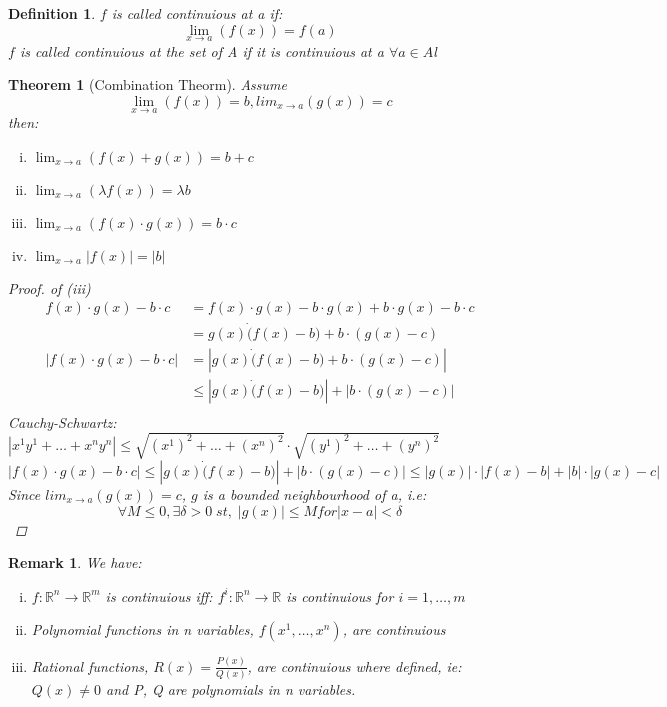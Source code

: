 \documentclass[12pt]{article}
\def\RR{\mathbb{R}}
\newtheorem{theorem}{Theorem}[section]
\newtheorem{definition}{Definition}[section]
\newtheorem*{remark}{Remark}
\begin{document}
\begin{definition}
$f$ is called continuious at a if:
\[\lim_{x\to a} (f(x))=f(a)\]
$f$ is called continuious at the set of A if it is continuious at a $\forall a \in A$l
\end{definition}

\begin{theorem}[Combination Theorm]\label{T:Combination Theorm}
Assume \[\lim_{x\to a} (f(x))=b, lim_{x\to a} (g(x))=c\]
then:
\begin{enumerate}[(i)]
\item$\lim_{x\to a} (f(x) + g(x))=b+c$
\item$\lim_{x\to a} (\lambda f(x))=\lambda b$
\item$\lim_{x\to a} (f(x)\cdot g(x))=b\cdot c$
\item$\lim_{x\to a} |f(x)|=|b|$
\end{enumerate}
\begin{proof}
of (iii)
\begin{align*}
f(x)\cdot g(x)-b\cdot c &= f(x)\cdot g(x) -b\cdot g(x) + b\cdot g(x) -b\cdot c \\
&= g(x)\dot (f(x)-b) + b\cdot (g(x) - c) \\
|f(x)\cdot g(x)-b\cdot c|&= |g(x)\dot (f(x)-b) + b\cdot (g(x) - c)|\\
 &\leq |g(x)\dot (f(x)-b)| +| b\cdot (g(x) - c)|\\
\end{align*}
Cauchy-Schwartz: $|x^{1}y^{1} + \dots +x^{n}y^{n}| \leq \sqrt{(x^{1})^{2} + \dots +(x^{n})^{2}} \cdot \sqrt{(y^{1})^{2} + \dots +(y^{n})^{2}}$
\[|f(x)\cdot g(x)-b\cdot c| \leq |g(x)\dot (f(x)-b)| +| b\cdot (g(x) - c)|  \leq |g(x)|\cdot |f(x)-b| +|b|\cdot |g(x) - c|\]
Since $ lim_{x\to a} (g(x))=c$, $g$ is a bounded neighbourhood of a, i.e: 
\[
\forall M \leq 0, \exists \delta > 0 \; st,\; 
|g(x)| \leq M for |x-a|<\delta\] 
\end{proof}
\end{theorem}

\begin{remark} We have:\\
\begin{enumerate}[(i)]
\item $f:\RR^{n} \rightarrow \RR^{m}$ is continuious iff: $f^{i}:\RR^{n} \rightarrow \RR$ is continuious for $i=1,\dots , m$
\item Polynomial functions in n variables, $f(x^{1}, \dots ,x^{n})$, are continuious
\item Rational functions, $R(x)= \frac{P(x)}{Q(x)}$, are continuious where defined, ie: $Q(x) \neq 0$ and P, Q are polynomials in n variables.
\end{enumerate}
\end{remark}
\end{document}
